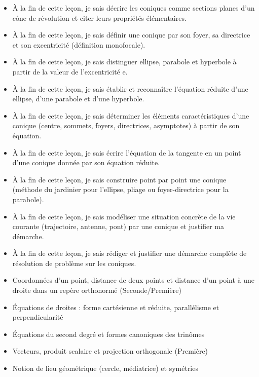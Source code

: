 \documentclass[11pt]{article}
\begin{document}
\begin{objectifs}
\begin{itemize}
\item À la fin de cette leçon, je sais décrire les coniques comme sections planes d'un cône de révolution et citer leurs propriétés élémentaires.
\item À la fin de cette leçon, je sais définir une conique par son foyer, sa directrice et son excentricité (définition monofocale).
\item À la fin de cette leçon, je sais distinguer ellipse, parabole et hyperbole à partir de la valeur de l'excentricité e.
\item À la fin de cette leçon, je sais établir et reconnaître l'équation réduite d'une ellipse, d'une parabole et d'une hyperbole.
\item À la fin de cette leçon, je sais déterminer les éléments caractéristiques d'une conique (centre, sommets, foyers, directrices, asymptotes) à partir de son équation.
\item À la fin de cette leçon, je sais écrire l'équation de la tangente en un point d'une conique donnée par son équation réduite.
\item À la fin de cette leçon, je sais construire point par point une conique (méthode du jardinier pour l'ellipse, pliage ou foyer-directrice pour la parabole).
\item À la fin de cette leçon, je sais modéliser une situation concrète de la vie courante (trajectoire, antenne, pont) par une conique et justifier ma démarche.
\item À la fin de cette leçon, je sais rédiger et justifier une démarche complète de résolution de problème sur les coniques.
\end{itemize}
\end{objectifs}

\begin{prerequis}
\begin{itemize}
\item Coordonnées d'un point, distance de deux points et distance d'un point à une droite dans un repère orthonormé (Seconde/Première)
\item Équations de droites : forme cartésienne et réduite, parallélisme et perpendicularité
\item Équations du second degré et formes canoniques des trinômes
\item Vecteurs, produit scalaire et projection orthogonale (Première)
\item Notion de lieu géométrique (cercle, médiatrice) et symétries
\end{itemize}
\end{prerequis}
\end{document}
